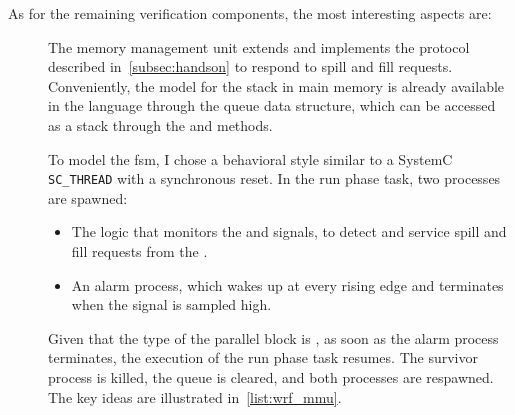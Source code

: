 As for the remaining verification components, the most interesting aspects are:
\begin{description}
    \item[] The memory management unit extends  and implements the protocol described in~\cref{subsec:handson} to respond to spill and fill requests. Conveniently, the model for the stack in main memory is already available in the language through the \sv queue data structure, which can be accessed as a stack through the  and  methods. 
    
    To model the \ac{fsm}, I chose a behavioral style similar to a SystemC \verb|SC_THREAD| with a synchronous reset. In the run phase task, two processes are spawned:
    \begin{itemize}
        \item The logic that monitors the  and  signals, to detect and service spill and fill requests from the \dut.
        \item An alarm process, which wakes up at every rising edge and terminates when the  signal is sampled high.
    \end{itemize}
    Given that the type of the parallel block is , as soon as the alarm process terminates, the execution of the run phase task resumes. The survivor process is killed, the queue is cleared, and both processes are respawned. The key ideas are illustrated in~\cref{list:wrf_mmu}.
    

\end{description}

